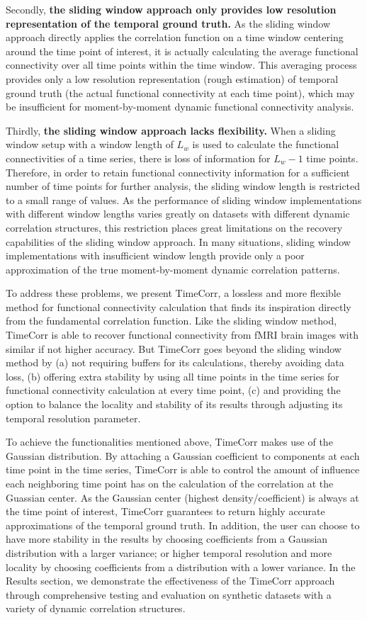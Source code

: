 \documentclass[11pt]{article}
\begin{document}
Secondly, \textbf{the sliding window approach only provides low resolution representation of the temporal ground truth.} As the sliding window approach directly applies the correlation function on a time window centering around the time point of interest, it is actually calculating the average functional connectivity over all time points within the time window. This averaging process provides only a low resolution representation (rough estimation) of temporal ground truth (the actual functional connectivity at each time point), which may be insufficient for moment-by-moment dynamic functional connectivity analysis.

Thirdly, \textbf{the sliding window approach lacks flexibility.} When a sliding window setup with a window length of $L_w$ is used to calculate the functional connectivities of a time series, there is loss of information for $L_w-1$ time points. Therefore, in order to retain functional connectivity information for a sufficient number of time points for further analysis, the sliding window length is restricted to a small range of values. As the performance of sliding window implementations with different window lengths varies greatly on datasets with different dynamic correlation structures, this restriction places great limitations on the recovery capabilities of the sliding window approach. In many situations, sliding window implementations with insufficient window length provide only a poor approximation of the true moment-by-moment dynamic correlation patterns.

To address these problems, we present TimeCorr, a lossless and more flexible method for functional connectivity calculation that finds its inspiration directly from the fundamental correlation function. Like the sliding window method, TimeCorr is able to recover functional connectivity from fMRI brain images with similar if not higher accuracy. But TimeCorr goes beyond the sliding window method by (a) not requiring buffers for its calculations, thereby avoiding data loss, (b) offering extra stability by using all time points in the time series for functional connectivity calculation at every time point, (c) and providing the option to balance the locality and stability of its results through adjusting its temporal resolution parameter.

To achieve the functionalities mentioned above, TimeCorr makes use of the Gaussian distribution. By attaching a Gaussian coefficient to components at each time point in the time series, TimeCorr is able to control the amount of influence each neighboring time point has on the calculation of the correlation at the Guassian center. As the Gaussian center (highest density/coefficient) is always at the time point of interest, TimeCorr guarantees to return highly accurate approximations of the temporal ground truth. In addition, the user can choose to have more stability in the results by choosing coefficients from a Gaussian distribution with a larger variance; or higher temporal resolution and more locality by choosing coefficients from a distribution with a lower variance. In the Results section, we demonstrate the effectiveness of the TimeCorr approach through comprehensive testing and evaluation on synthetic datasets with a variety of dynamic correlation structures.
\end{document}
